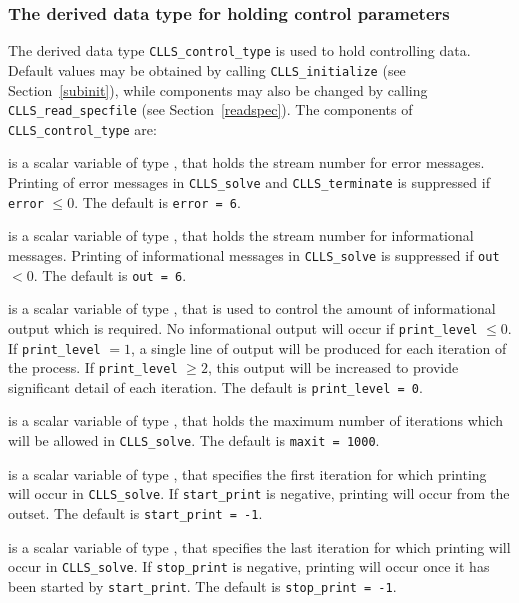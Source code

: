 \documentclass{galahad}
\newcommand{\packagename}{CLLS}
\begin{document}

\subsubsection{The derived data type for holding control
 parameters}\label{typecontrol}
The derived data type
{\tt \packagename\_control\_type}
is used to hold controlling data. Default values may be obtained by calling
{\tt \packagename\_initialize}
(see Section~\ref{subinit}),
while components may also be changed by calling
{\tt \packagename\_read\-\_specfile}
(see Section~\ref{readspec}).
The components of
{\tt \packagename\_control\_type}
are:

\begin{description}

 is a scalar variable of type \integer, that holds the
stream number for error messages. Printing of error messages in
{\tt \packagename\_solve} and {\tt \packagename\_terminate} is suppressed if
{\tt error} $\leq 0$.
The default is {\tt error = 6}.

 is a scalar variable of type \integer, that holds the
stream number for informational messages. Printing of informational messages in
{\tt \packagename\_solve} is suppressed if {\tt out} $< 0$.
The default is {\tt out = 6}.

 is a scalar variable of type \integer, that is used
to control the amount of informational output which is required. No
informational output will occur if {\tt print\_level} $\leq 0$. If
{\tt print\_level} $= 1$, a single line of output will be produced for each
iteration of the process. If {\tt print\_level} $\geq 2$, this output will be
increased to provide significant detail of each iteration.
The default is {\tt print\_level = 0}.

 is a scalar variable of type \integer, that holds the
maximum number of iterations which will be allowed in {\tt \packagename\_solve}.
The default is {\tt maxit = 1000}.

 is a scalar variable of type \integer, that specifies
the first iteration for which printing will occur in {\tt \packagename\_solve}.
If {\tt start\_print} is negative, printing will occur from the outset.
The default is {\tt start\_print = -1}.

 is a scalar variable of type \integer, that specifies
the last iteration for which printing will occur in  {\tt \packagename\_solve}.
If {\tt stop\_print} is negative, printing will occur once it has been
started by {\tt start\_print}.
The default is {\tt stop\_print = -1}.


\end{description}
\end{document}
